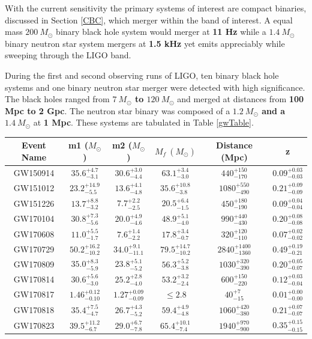 \documentclass [12pt, proquest]{uwthesis}[2019]
\begin{document}
With the current sensitivity the primary systems of interest are compact binaries, discussed in Section \ref{CBC}, which merger within the band of interest. A equal mass \textbf{$200\ M_\odot$} binary black hole system would merger at \textbf{11 Hz} while a \textbf{$1.4\ M_\odot$} binary neutron star system mergers at \textbf{1.5 kHz} yet emits appreciably while sweeping through the LIGO band.

During the first and second observing runs of LIGO, ten binary black hole systems and one binary neutron star merger were detected with high significance. \cite{GWTC} The black holes ranged from \textbf{$7\ M_\odot$ to $120\ M_\odot$} and merged at distances from \textbf{100 Mpc to 2 Gpc}. The neutron star binary was composed of a \textbf{$1.2\ M_\odot$ and a $1.4\ M_\odot$} at \textbf{1 Mpc}. These systems are tabulated in Table \ref{gwTable}.

\begin{center}
\begin{tabular}{| c | c | c | c | c | c |}
\hline
Event Name & m1 ($M_\odot$) & m2 ($M_\odot$) & $M_f\ (M_\odot)$ & Distance (Mpc) & z\\
\hline \hline
GW150914 & $35.6^{+4.7}_{-3.1}$ & $30.6^{+3.0}_{-4.4}$ & $63.1^{+3.4}_{-3.0}$ & $440^{+150}_{-170}$ & $0.09^{+0.03}_{-0.03}$\\
\hline
GW151012 & $23.2^{+14.9}_{-5.5}$ & $13.6^{+4.1}_{-4.8}$  & $35.6^{+10.8}_{-3.8}$ & $1080^{+550}_{-490}$& $0.21^{+0.09}_{-0.09}$\\
\hline
GW151226 & $13.7^{+8.8}_{-3.2}$ & $7.7^{+2.2}_{-2.5}$ & $20.5^{+6.4}_{-1.5}$ & $450^{+180}_{-190}$ & $0.09^{+0.04}_{-0.04}$\\
\hline
GW170104 & $30.8^{+7.3}_{-5.6}$ & $20.0^{+4.9}_{-4.6}$ & $48.9^{+5.1}_{-4.0}$ & $990^{+440}_{-430}$ & $0.20^{+0.08}_{-0.08}$\\
\hline
GW170608 & $11.0^{+5.5}_{-1.7}$ & $7.6^{+1.4}_{-2.2}$ & $17.8^{+3.4}_{-0.7}$ & $320^{+120}_{-110}$ & $0.07^{+0.02}_{-0.02}$\\
\hline
GW170729 & $50.2^{+16.2}_{-10.2}$ & $34.0^{+9.1}_{-11.1}$ & $79.5^{+14.7}_{-10.2}$ & $2840^{+1400}_{-1360}$ & $0.49^{+0.19}_{-0.21}$\\
\hline
GW170809 & $35.0^{+8.3}_{-5.9}$ & $23.8^{+5.1}_{-5.2}$ & $56.3^{+5.2}_{-3.8}$ & $1030^{+320}_{-390}$ & $0.20^{+0.05}_{-0.07}$\\
\hline
GW170814 & $30.6^{+5.6}_{-3.0}$ & $25.2^{+2.8}_{-4.0}$ & $53.2^{+3.2}_{-2.4}$ & $600^{+150}_{-220}$ & $0.12^{+0.03}_{-0.04}$\\
\hline
GW170817 & $1.46^{+0.12}_{-0.10}$ & $1.27^{+0.09}_{-0.09}$ & $\le2.8$ & $40^{+7}_{-15}$ & $0.01^{+0.00}_{-0.00}$\\
\hline
GW170818 & $35.4^{+7.5}_{-4.7}$ & $26.7^{+4.3}_{-5.2}$ & $59.4^{+4.9}_{-4.8}$ & $1060^{+420}_{-380}$ & $0.21^{+0.07}_{-0.07}$\\
\hline
GW170823 & $39.5^{+11.2}_{-6.7}$ & $29.0^{+6.7}_{-7.8}$ & $65.4^{+10.1}_{-7.4}$ & $1940^{+970}_{-900}$ & $0.35^{+0.15}_{-0.15}$\\
\hline
\end{tabular}
\end{center}
\end{document}
